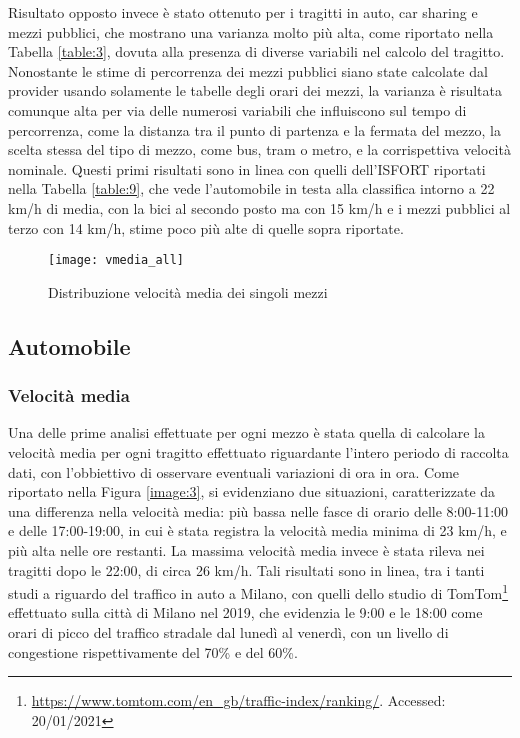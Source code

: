  Risultato opposto invece è stato ottenuto per i tragitti in auto, car sharing e mezzi pubblici, che mostrano una varianza molto più alta, come riportato nella Tabella \ref{table:3}, dovuta alla presenza di diverse variabili nel calcolo del tragitto. Nonostante le stime di percorrenza dei mezzi pubblici siano state calcolate dal provider usando solamente le tabelle degli orari dei mezzi, la varianza è risultata comunque alta per via delle numerosi variabili che influiscono sul tempo di percorrenza, come la distanza tra il punto di partenza e la fermata del mezzo, la scelta stessa del tipo di mezzo, come bus, tram o metro, e la corrispettiva velocità nominale. Questi primi risultati sono in linea con quelli dell'ISFORT riportati nella Tabella \ref{table:9}, che vede l'automobile in testa alla classifica intorno a 22 km/h di media, con la bici al secondo posto ma con 15 km/h e i mezzi pubblici al terzo con 14 km/h, stime poco più alte di quelle sopra riportate.

\begin{figure}[H]
\centering
\texttt{[image: vmedia\_all]}
\caption{Distribuzione velocità media dei singoli mezzi}
\label{image:26}
\end{figure}

\pagebreak

\subsection{Automobile}

\subsubsection{Velocità media}

Una delle prime analisi effettuate per ogni mezzo è stata quella di calcolare la velocità media per ogni tragitto effettuato riguardante l'intero periodo di raccolta dati, con l'obbiettivo di osservare eventuali variazioni di ora in ora. Come riportato nella Figura \ref{image:3}, si evidenziano due situazioni, caratterizzate da una differenza nella velocità media: più bassa nelle fasce di orario delle 8:00-11:00 e delle 17:00-19:00, in cui è stata registra la velocità media minima di 23 km/h, e più alta nelle ore restanti. La massima velocità media invece è stata rileva nei tragitti dopo le 22:00, di circa 26 km/h. Tali risultati sono in linea, tra i tanti studi a riguardo del traffico in auto a Milano, con quelli dello studio di TomTom\footnote{\url{https://www.tomtom.com/en_gb/traffic-index/ranking/}. Accessed: 20/01/2021} effettuato sulla città di Milano nel 2019, che evidenzia le 9:00 e le 18:00 come orari di picco del traffico stradale dal lunedì al venerdì, con un livello di congestione rispettivamente del 70\% e del 60\%.

